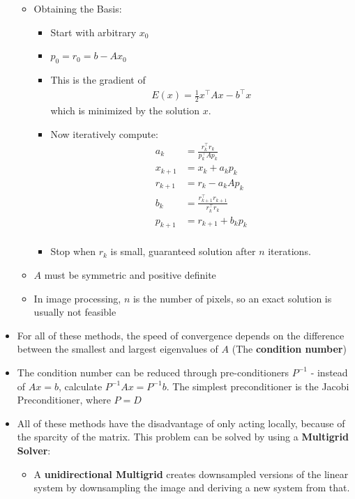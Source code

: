 \documentclass{scrartcl}
\begin{document}
\begin{itemize}
\begin{itemize}
        \item Obtaining the Basis:
        \begin{itemize}
            \item Start with arbitrary $x_0$
            \item $p_0 = r_0 = b - Ax_0$
            \item This is the gradient of 
            \begin{align*}
                E(x) = \frac{1}{2}x^\top Ax - b^\top x
            \end{align*}
            which is minimized by the solution $x$.
            \item Now iteratively compute:
            \begin{align*}
                a_k &= \frac{r_k^\top r_k}{p_k^\top A p_k}\\
                x_{k+1} &= x_k  + a_k p_k\\
                r_{k+1} &= r_k - a_k A p_k\\
                b_k &=  \frac{r_{k+1}^\top r_{k+1}}{r_k^\top r_k}\\
                p_{k+1} &= r_{k+1} + b_k p_k\\
            \end{align*}
            \item Stop when $r_k$ is small, guaranteed solution after $n$ iterations.
        \end{itemize}
        \item $A$ must be symmetric and positive definite
        \item In image processing, $n$ is the number of pixels, so an exact solution is usually not feasible
    \end{itemize}
    \item For all of these methods, the speed of convergence depends on the difference between the smallest and largest eigenvalues of $A$ (The \textbf{condition number})
    \item The condition number can be reduced through pre-conditioners $P^{-1}$ - instead of $Ax = b$, calculate $P^{-1}Ax = P^{-1}b$. The simplest preconditioner is the Jacobi Preconditioner, where $P = D$
    \item All of these methods have the disadvantage of only acting locally, because of the sparcity of the matrix. This problem can be solved by using a \textbf{Multigrid Solver}:
    \begin{itemize}
        \item A \textbf{unidirectional Multigrid} creates downsampled versions of the linear system by downsampling the image and deriving a new system from that.

\end{itemize}
\end{itemize}
\end{document}
